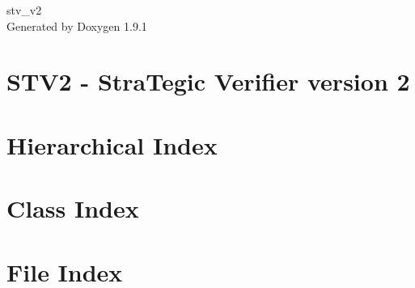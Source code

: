 \let\mypdfximage\pdfximage\def\pdfximage{\immediate\mypdfximage}\documentclass[twoside]{book}
\newcommand{\+}{\discretionary{\mbox{\scriptsize$\hookleftarrow$}}{}{}}
\newcommand{\clearemptydoublepage}{%
  \newpage{\pagestyle{empty}\cleardoublepage}%
}
\begin{document}
\raggedbottom

\hypersetup{pageanchor=false,
             bookmarksnumbered=true,
             pdfencoding=unicode
            }
\begin{titlepage}
\vspace*{7cm}
\begin{center}%
{\Large stv\+\_\+v2 }\\
\vspace*{1cm}
{\large Generated by Doxygen 1.9.1}\\
\end{center}
\end{titlepage}
\clearemptydoublepage
{}
\tableofcontents
\clearemptydoublepage
{}
\hypersetup{pageanchor=true}

\chapter{STV2 -\/ Stra\+Tegic Verifier version 2}
\label{md__home_mathis_repositories_stv_v2_README}

\chapter{Hierarchical Index}

\chapter{Class Index}

\chapter{File Index}

\end{document}
